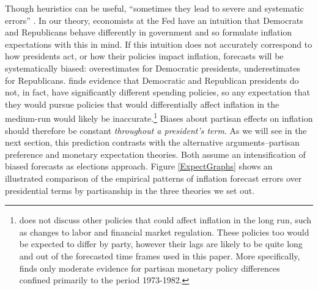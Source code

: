 \documentclass[a4paper]{article}\usepackage[]{graphicx}\usepackage[]{color}
\begin{document}
Though heuristics can be useful, ``sometimes they lead to severe and systematic errors'' \citep[][1124]{tverskykahneman1974}. In our theory, economists at the Fed have an intuition that Democrats and Republicans behave differently in government and so formulate inflation expectations with this in mind. If this intuition does not accurately correspond to how presidents act, or how their policies impact inflation, forecasts will be systematically biased: overestimates for Democratic presidents, underestimates for Republicans. \cite{Bartels2008} finds evidence that Democratic and Republican presidents do not, in fact, have significantly different spending policies, so any expectation that they would pursue policies that would differentially affect inflation in the medium-run would likely be inaccurate.\footnote{\cite{Bartels2008} does not discuss other policies that could affect inflation in the long run, such as changes to labor and financial market regulation. These policies too would be expected to differ by party, however their lags are likely to be quite long and out of the forecasted time frames used in this paper. More specifically, \cite{Franzese2002} finds only moderate evidence for partisan monetary policy differences confined primarily to the period 1973-1982.} Biases about partisan effects on inflation should therefore be constant {\emph{throughout a president's term}}. As we will see in the next section, this prediction contrasts with the alternative arguments--partisan preference and monetary expectation theories. Both assume an intensification of biased forecasts as elections approach. Figure \ref{ExpectGraphs} shows an illustrated comparison of the empirical patterns of inflation forecast errors over presidential terms by partisanship in the three theories we set out.
\end{document}
